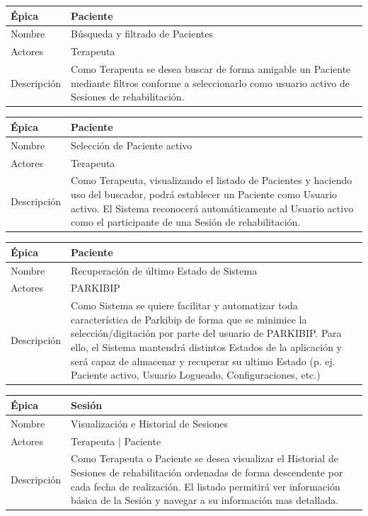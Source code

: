\begin{table}[H] 
\centering
\begin{tabular}{| p{2cm} | p{10cm} |}
\hline
Épica & Paciente\\ \hline
Nombre & Búsqueda y filtrado de Pacientes\\ \hline
Actores & Terapeuta\\ \hline
Descripción &  Como Terapeuta se desea buscar de forma amigable un Paciente mediante filtros conforme a seleccionarlo como usuario activo de Sesiones de rehabilitación.\\ \hline
\end{tabular}
\end{table}

\begin{table}[H] 
\centering
\begin{tabular}{| p{2cm} | p{10cm} |}
\hline
Épica & Paciente\\ \hline
Nombre & Selección de Paciente activo\\ \hline
Actores & Terapeuta\\ \hline
Descripción &  Como Terapeuta, visualizando el listado de Pacientes y haciendo uso del buscador, podrá establecer un Paciente como Usuario activo. El Sistema reconocerá automáticamente al Usuario activo como el participante de una Sesión de rehabilitación.\\ \hline
\end{tabular}
\end{table}

\begin{table}[H] 
\centering
\begin{tabular}{| p{2cm} | p{10cm} |}
\hline
Épica & Paciente\\ \hline
Nombre & Recuperación de último Estado de Sistema\\ \hline
Actores & PARKIBIP\\ \hline
Descripción &  Como Sistema se quiere facilitar y automatizar toda característica de Parkibip de forma que se minimice la selección/digitación por parte del usuario de PARKIBIP. Para ello, el Sistema mantendrá distintos Estados de la aplicación y será capaz de almacenar y recuperar su ultimo Estado (p. ej. Paciente activo, Usuario Logueado, Configuraciones, etc.) \\ \hline
\end{tabular}
\end{table}

\begin{table}[H] 
\centering
\begin{tabular}{| p{2cm} | p{10cm} |}
\hline
Épica & Sesión\\ \hline
Nombre & Visualización e Historial de Sesiones \\ \hline
Actores & Terapeuta | Paciente\\ \hline
Descripción & Como Terapeuta o Paciente se desea visualizar el Historial de Sesiones de rehabilitación ordenadas de forma descendente por cada fecha de realización. El listado permitirá ver información básica de la Sesión y navegar a su información mas detallada. \\ \hline
\end{tabular}
\end{table}

